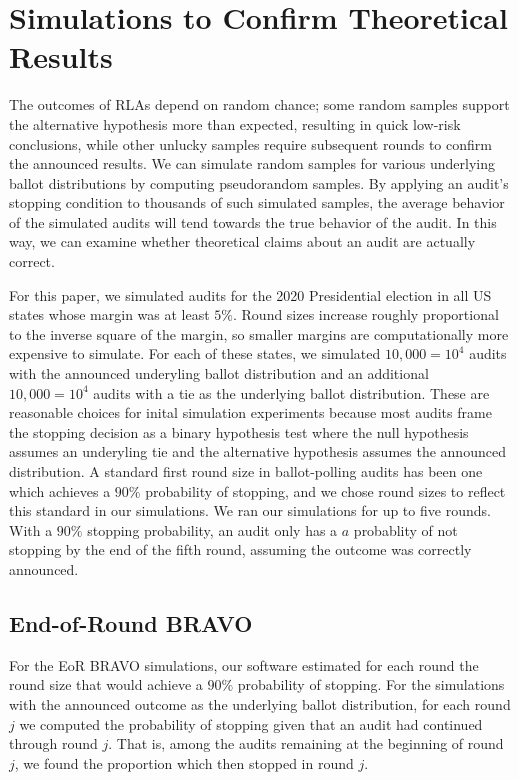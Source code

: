 \documentclass{article}
\begin{document}
\section{Simulations to Confirm Theoretical Results}

The outcomes of RLAs depend on random chance; some random samples
support the alternative hypothesis more than expected, resulting in 
quick low-risk conclusions, while other unlucky samples require subsequent
rounds to confirm the announced results.
We can simulate random samples for various underlying ballot 
distributions by computing pseudorandom samples. 
By applying an audit's stopping condition to thousands of such
simulated samples, the average behavior of the simulated
audits will tend towards the true behavior of the audit.
In this way, we can examine whether theoretical claims about an audit are
actually correct.

For this paper, we simulated audits for 
the 2020 Presidential election
in all US states whose margin was at least $5\%$.
Round sizes increase roughly proportional to the inverse
square of the margin, so 
smaller margins are computationally more expensive to simulate.
For each of these states, we simulated 
$10,000=10^4$ audits with the announced
underyling ballot distribution
and an additional $10,000=10^4$ audits with a tie
as the underlying ballot distribution.
These are reasonable choices for inital simulation experiments
because most audits frame the stopping decision as a binary
hypothesis test where the null hypothesis assumes an underyling tie
and the alternative hypothesis assumes the announced distribution.
A standard first round size in ballot-polling audits
has been one which achieves a $90\%$ probability
of stopping, and we chose round sizes to reflect this standard
in our simulations.
We ran our simulations for up to five rounds.
With a $90\%$ stopping probability, 
an audit only has a $a$ probablity of not stopping
by the end of the fifth round, assuming the outcome was correctly
announced.


\subsection{End-of-Round BRAVO}
For the EoR BRAVO simulations, our software estimated for each round
the round size that would achieve a $90\%$ probability of stopping.
For the simulations with the announced outcome as the underlying
ballot distribution, for each round $j$ we computed the probability
of stopping given that an audit had continued through round $j$.
That is, among the audits remaining at the beginning of round $j$, 
we found the proportion which then stopped in round $j$.
\end{document}
